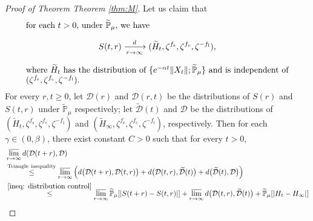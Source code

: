 \documentclass[12pt,a4paper]{amsart}
\theoremstyle{plain}
\theoremstyle{definition}
\numberwithin{equation}{section}
\begin{document}
\begin{proof}[Proof of Theorem Theorem \ref{thm:M}]
Let us claim that
\begin{equation}\label{eq:M.3}
\begin{minipage}{0.9\textwidth}
	for each $t> 0$, under $\widetilde{\mathbb P}_{\mu}$, we have
	\[
	S(t,r)\xrightarrow[r\rightarrow \infty]{d} (\widetilde H_t,\zeta^{f_\mathrm s},\zeta^{f_\mathrm c},\zeta^{-f_\mathrm l}),
	\]
	where $\widetilde H_t$ has the distribution of $\{e^{-\alpha t} \|X_t\|; \widetilde {\mathbb P}_\mu\}$ and is independent of $(\zeta^{f_\mathrm s},\zeta^{f_\mathrm c},\zeta^{-f_\mathrm l})$.
\end{minipage}
\end{equation}
For every $r,t\geq 0$, let $\mathcal D(r)$ and $\mathcal D(r,t)$ be the distributions of $S(r)$ and $S(t,r)$ under $\widetilde{\mathbb P}_{\mu}$ respectively;
let $\widetilde{\mathcal D}(t)$ and $\mathcal D$ be the distributions of $(\widetilde H_t,\zeta^{f_\mathrm s},\zeta^{f_\mathrm c},\zeta^{-f_\mathrm l})$ and $(\widetilde H_\infty,\zeta^{f_\mathrm s},\zeta^{f_\mathrm c},\zeta^{-f_\mathrm l})$, respectively.
 Then for each $\gamma\in (0,\beta)$, there exist constant $C>0$
 such that for every $t > 0$,
\begin{align}
 &\varlimsup_{r\rightarrow \infty}d(\mathcal D(t+r),\mathcal D)
 \\& \overset{\rm Triangle~inequality}\leq \varlimsup_{r\rightarrow \infty}\Big( d\big(\mathcal D(t+r),\mathcal D(t,r)\big)+d\big(\mathcal D(t,r),\widetilde{\mathcal D}(t)\big)+d\big(\widetilde{\mathcal D}(t),\mathcal D\big)\Big)
 \\&\overset{\eqref{ineq: distribution control}} \leq \varlimsup_{r\rightarrow \infty}\widetilde{\mathbb P}_{\mu}[|S(t+r) - S(t,r)|]+ \varlimsup_{r\rightarrow \infty} d\big(\mathcal D(t,r),\widetilde{\mathcal D}(t)\big) +\widetilde{\mathbb P}_{\mu}[|H_t-H_{\infty}|]

\end{align}
\end{proof}
\end{document}
